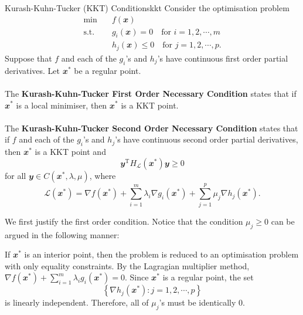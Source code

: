 \documentclass[math, code]{amznotes}
\theoremstyle{remark}
\begin{document}
\begin{thmbox}{Kurash-Kuhn-Tucker (KKT) Conditions}{kkt}
    Consider the optimisation problem
    \begin{align*}
        \min & \quad f(\mathbfit{x}) \\
        \mathrm{s.t.} & \quad g_i(\mathbfit{x}) = 0 \quad\textrm{for } i = 1, 2, \cdots, m \\
        & \quad h_j(\mathbfit{x}) \leq 0 \quad\textrm{for } j = 1, 2, \cdots, p.
    \end{align*}
    Suppose that $f$ and each of the $g_i$'s and $h_j$'s have continuous first order partial derivatives. Let $\mathbfit{x}^*$ be a regular point.
    \\\\
    The {\color{red} \textbf{Kurash-Kuhn-Tucker First Order Necessary Condition}} states that if $\mathbfit{x}^*$ is a local minimiser, then $\mathbfit{x}^*$ is a KKT point.
    \\\\
    The {\color{red} \textbf{Kurash-Kuhn-Tucker Second Order Necessary Condition}} states that if $f$ and each of the $g_i$'s and $h_j$'s have continuous second order partial derivatives, then $\mathbfit{x}^*$ is a KKT point and 
    \begin{equation*}
        \mathbfit{y}^{\mathrm{T}}H_{\mathcal{L}}(\mathbfit{x}^*)\mathbfit{y} \geq 0
    \end{equation*}
    for all $\mathbfit{y} \in C(\mathbfit{x}^*, \lambda, \mu)$, where
    \begin{equation*}
        \mathcal{L}(\mathbfit{x}^*) = \nabla f(\mathbfit{x}^*) + \sum_{i = 1}^{m}\lambda_i\nabla g_i(\mathbfit{x}^*) + \sum_{j = 1}^{p}\mu_j\nabla h_j(\mathbfit{x}^*).
    \end{equation*}
\end{thmbox}
We first justify the first order condition. Notice that the condition $\mu_j \geq 0$ can be argued in the following manner:

If $\mathbfit{x}^*$ is an interior point, then the problem is reduced to an optimisation problem with only equality constraints. By the Lagragian multiplier method, $\nabla f(\mathbfit{x}^*) + \sum_{i = 1}^{m}\lambda_i g_i(\mathbfit{x}^*) = \mathbfit{0}$. Since $\mathbfit{x}^*$ is a regular point, the set
\begin{displaymath}
    \left\{\nabla h_j(\mathbfit{x}^*) \colon j = 1, 2, \cdots, p\right\}
\end{displaymath}
is linearly independent. Therefore, all of $\mu_j$'s must be identically $0$.
\end{document}
